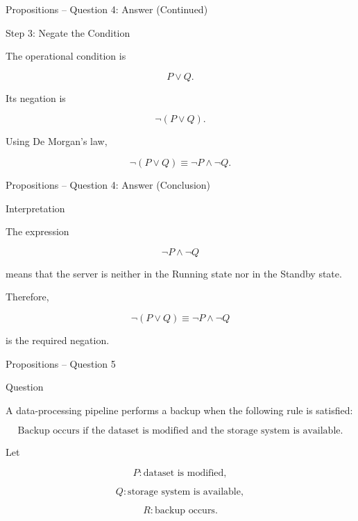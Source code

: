 
\begin{frame}{Propositions -- Question 4: Answer (Continued)}

\begin{exampleblock}{Step 3: Negate the Condition}

The operational condition is

$$
P\lor Q.
$$

Its negation is

$$
\neg(P\lor Q).
$$

Using De Morgan's law,

$$
\neg(P\lor Q)
\equiv
\neg P\land\neg Q.
$$

\end{exampleblock}

\end{frame}


\begin{frame}{Propositions -- Question 4: Answer (Conclusion)}

\begin{exampleblock}{Interpretation}

The expression

$$
\neg P\land\neg Q
$$

means that the server is neither in the Running state nor in the
Standby state.

Therefore,

$$
\boxed{\neg(P\lor Q)\equiv\neg P\land\neg Q}
$$

is the required negation.

\end{exampleblock}

\end{frame}


\begin{frame}{Propositions -- Question 5}

\begin{block}{Question}

A data-processing pipeline performs a backup when the following rule is
satisfied:

$$
\text{Backup occurs if the dataset is modified and the storage system
is available.}
$$

Let

$$
P:\text{dataset is modified},
$$

$$
Q:\text{storage system is available},
$$

$$
R:\text{backup occurs}.
$$

\end{block}

\end{frame}

